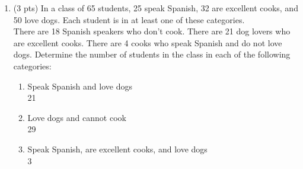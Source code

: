 \documentclass[12pt]{article}
\begin{document}
\begin{enumerate}
\item (3 pts)
In a class of 65 students, 25 speak Spanish, 32 are excellent cooks, and 50 love dogs.  Each student is in at least one of these categories.\\
There are 18 Spanish speakers who don't cook.
There are 21 dog lovers who are excellent cooks.
There are 4 cooks who speak Spanish and do not love dogs.
Determine the number of students in the class in each of the following categories:
\begin{enumerate}
	\item Speak Spanish and love dogs
    \\21
	\item Love dogs and cannot cook
    \\29
	\item Speak Spanish, are excellent cooks, and love dogs
    \\3
\end{enumerate}


\end{enumerate}
\end{document}
